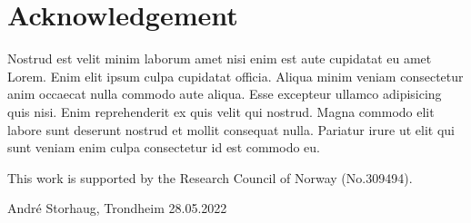 \chapter*{Acknowledgement}
Nostrud est velit minim laborum amet nisi enim est aute cupidatat eu amet Lorem. Enim elit ipsum culpa cupidatat officia. Aliqua minim veniam consectetur anim occaecat nulla commodo aute aliqua. Esse excepteur ullamco adipisicing quis nisi. Enim reprehenderit ex quis velit qui nostrud. Magna commodo elit labore sunt deserunt nostrud et mollit consequat nulla. Pariatur irure ut elit qui sunt veniam enim culpa consectetur id est commodo eu.

\bigskip\noindent
This work is supported by the Research Council of Norway (No.309494).

\begin{flushright}
    André Storhaug, Trondheim 28.05.2022
\end{flushright}